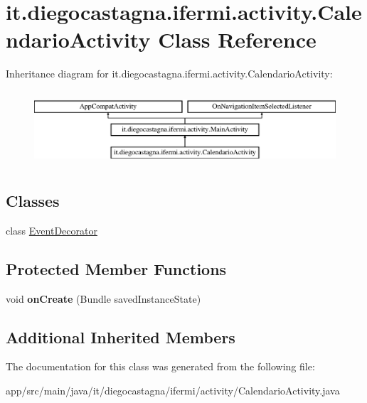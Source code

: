 \hypertarget{classit_1_1diegocastagna_1_1ifermi_1_1activity_1_1_calendario_activity}{}\section{it.\+diegocastagna.\+ifermi.\+activity.\+Calendario\+Activity Class Reference}
\label{classit_1_1diegocastagna_1_1ifermi_1_1activity_1_1_calendario_activity}
Inheritance diagram for it.\+diegocastagna.\+ifermi.\+activity.\+Calendario\+Activity\+:\begin{figure}[H]
\begin{center}
\leavevmode
\includegraphics[height=2.809365cm]{classit_1_1diegocastagna_1_1ifermi_1_1activity_1_1_calendario_activity}
\end{center}
\end{figure}
\subsection*{Classes}
\begin{DoxyCompactItemize}
\item 
class \mbox{\hyperlink{classit_1_1diegocastagna_1_1ifermi_1_1activity_1_1_calendario_activity_1_1_event_decorator}{Event\+Decorator}}
\end{DoxyCompactItemize}
\subsection*{Protected Member Functions}
\begin{DoxyCompactItemize}
\item 
\mbox{\label{classit_1_1diegocastagna_1_1ifermi_1_1activity_1_1_calendario_activity_a1c3b5c9a196cb280ea72f2df1402184a}} 
void {\bfseries on\+Create} (Bundle saved\+Instance\+State)
\end{DoxyCompactItemize}
\subsection*{Additional Inherited Members}


The documentation for this class was generated from the following file\+:\begin{DoxyCompactItemize}
\item 
app/src/main/java/it/diegocastagna/ifermi/activity/Calendario\+Activity.\+java\end{DoxyCompactItemize}
